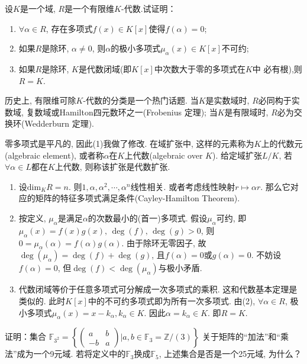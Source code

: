 \begin{problem}
    设$K$是一个域, $R$是一个有限维$K$-代数.试证明：
\begin{enumerate}[(1)]
    \item $\forall \alpha \in R$, 存在多项式$f(x) \in K[x]$使得$f(\alpha) = 0$;
    \item 如果$R$是除环, $\alpha \neq 0$, 则$\alpha$的极小多项式$\mu_\alpha(x) \in K[x]$不可约;
    \item 如果$R$是除环, $K$是代数闭域(即$K[x]$中次数大于零的多项式在$K$中
必有根),则$R = K$.
\end{enumerate}
历史上, 有限维可除$K$-代数的分类是一个热门话题. 当$K$是实数域时, $R$必同构于实数域,
复数域或Hamilton四元数环之一(Frobenius 定理);
当$K$是有限域时, $R$必为交换环(Wedderburn 定理).
\end{problem}

零多项式是平凡的, 因此(1)我做了修改. 在域扩张中, 这样的元素称为$K$上的代数元(algebraic element), 或者称$\alpha$在$K$上代数(algebraic over $K$). 给定域扩张$L/K$, 若$\forall \alpha \in L$都在$K$上代数, 则称该扩张是代数扩张.

\begin{solution}
    \begin{enumerate}[(1)]
        \item 设$\mathrm{dim}_K R = n$. 则$1, \alpha, \alpha^2, \cdots, \alpha^n$线性相关. 或者考虑线性映射$r \mapsto \alpha r$. 那么它对应的矩阵的特征多项式满足条件(Cayley-Hamilton Theorem).
        \item 按定义, $\mu_\alpha$是满足$\alpha$的次数最小的(首一)多项式. 假设$\mu_\alpha$可约, 即$\mu_\alpha(x) = f(x)g(x),\, \deg(f),\, \deg(g)> 0$, 则$0 = \mu_\alpha(\alpha) = f(\alpha)g(\alpha)$. 由于除环无零因子, 故$\deg(\mu_\alpha) = \deg(f) + \deg(g)$, 且$f(\alpha) = 0$或$g(\alpha) = 0$. 不妨设$f(\alpha) = 0$, 但$\deg(f) < \deg (\mu_\alpha)$与极小矛盾.
        \item 代数闭域等价于任意多项式可分解成一次多项式的乘积. 这和代数基本定理是类似的. 此时$K[x]$中的不可约多项式即为所有一次多项式. 由(2), $\forall \alpha \in R$, 极小多项式$\mu_\alpha(x) = x - k_\alpha, k_\alpha \in K$. 因此$\alpha = k_\alpha \in K$. 即$R = K$.
    \end{enumerate}
\end{solution}

\begin{problem}
    证明：集合
\(
    \mathbb{F}_{3^2} =
    \left\{
        \begin{pmatrix}
            a & b\\
            -b & a
        \end{pmatrix} 
    \bigg| a, b \in \mathbb{F}_3 = \mathbb{Z}/(3)
    \right\}
\)
关于矩阵的“加法”和“乘法”成为一个9元域.
若将定义中的$\mathbb{F}_3$换成$\mathbb{F}_5$,
上述集合是否是一个25元域, 为什么？
\end{problem}

